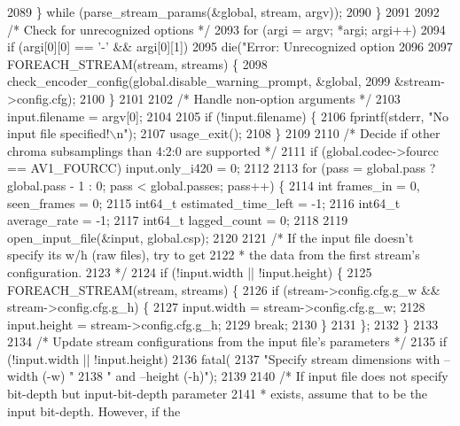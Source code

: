 \begin{DoxyCodeInclude}
{{{{{{{{{{{{{{{{{{{{{{{{{{{{{{{{{{{{{{{{{{{{{{{{{{2089     \} \textcolor{keywordflow}{while} (parse\_stream\_params(&global, stream, argv));
2090   \}
2091 
2092   \textcolor{comment}{/* Check for unrecognized options */}
2093   \textcolor{keywordflow}{for} (argi = argv; *argi; argi++)
2094     \textcolor{keywordflow}{if} (argi[0][0] == \textcolor{charliteral}{'-'} && argi[0][1])
2095       die(\textcolor{stringliteral}{"Error: Unrecognized option %
2096 
2097   FOREACH\_STREAM(stream, streams) \{
2098     check\_encoder\_config(global.disable\_warning\_prompt, &global,
2099                          &stream->config.cfg);
2100   \}
2101 
2102   \textcolor{comment}{/* Handle non-option arguments */}
2103   input.filename = argv[0];
2104 
2105   \textcolor{keywordflow}{if} (!input.filename) \{
2106     fprintf(stderr, \textcolor{stringliteral}{"No input file specified!\(\backslash\)n"});
2107     usage\_exit();
2108   \}
2109 
2110   \textcolor{comment}{/* Decide if other chroma subsamplings than 4:2:0 are supported */}
2111   \textcolor{keywordflow}{if} (global.codec->fourcc == AV1\_FOURCC) input.only\_i420 = 0;
2112 
2113   \textcolor{keywordflow}{for} (pass = global.pass ? global.pass - 1 : 0; pass < global.passes; pass++) \{
2114     \textcolor{keywordtype}{int} frames\_in = 0, seen\_frames = 0;
2115     int64\_t estimated\_time\_left = -1;
2116     int64\_t average\_rate = -1;
2117     int64\_t lagged\_count = 0;
2118 
2119     open\_input\_file(&input, global.csp);
2120 
2121     \textcolor{comment}{/* If the input file doesn't specify its w/h (raw files), try to get}
2122 \textcolor{comment}{     * the data from the first stream's configuration.}
2123 \textcolor{comment}{     */}
2124     \textcolor{keywordflow}{if} (!input.width || !input.height) \{
2125       FOREACH\_STREAM(stream, streams) \{
2126         \textcolor{keywordflow}{if} (stream->config.cfg.g\_w && stream->config.cfg.g\_h) \{
2127           input.width = stream->config.cfg.g\_w;
2128           input.height = stream->config.cfg.g\_h;
2129           \textcolor{keywordflow}{break};
2130         \}
2131       \};
2132     \}
2133 
2134     \textcolor{comment}{/* Update stream configurations from the input file's parameters */}
2135     \textcolor{keywordflow}{if} (!input.width || !input.height)
2136       fatal(
2137           \textcolor{stringliteral}{"Specify stream dimensions with --width (-w) "}
2138           \textcolor{stringliteral}{" and --height (-h)"});
2139 
2140     \textcolor{comment}{/* If input file does not specify bit-depth but input-bit-depth parameter}
2141 \textcolor{comment}{     * exists, assume that to be the input bit-depth. However, if the}
}}}}}}}}}}}}}}}}}}}}}}}}}}}}}}}}}}}}}}}}}}}}}}}}}}}
\end{DoxyCodeInclude}

